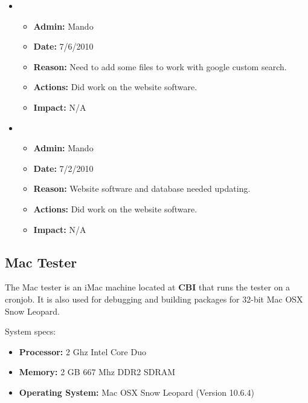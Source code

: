 \documentclass[12pt]{article}
\begin{document}
\begin{itemize}
\item 
\begin{itemize}
\item[] {\bf Admin:} Mando
\item[] {\bf Date:} 7/6/2010
\item[] {\bf Reason:} Need to add some files to work with google custom search.
\item[] {\bf Actions:} Did work on the website software. 
\item[] {\bf Impact:} N/A
\end{itemize}

\item 
\begin{itemize}
\item[] {\bf Admin:} Mando
\item[] {\bf Date:} 7/2/2010
\item[] {\bf Reason:} Website software and database needed updating.
\item[] {\bf Actions:} Did work on the website software. 
\item[] {\bf Impact:} N/A
\end{itemize}
\end{itemize}

\subsection*{Mac Tester}

The Mac tester is an iMac machine located at {\bf CBI} that runs the tester on a cronjob. It is also used for debugging and building packages for 32-bit Mac OSX Snow Leopard.

System specs:
\begin{itemize}
\item[] {\bf Processor:} 2 Ghz Intel Core Duo
\item[] {\bf Memory:} 2 GB 667 Mhz DDR2 SDRAM
\item[] {\bf Operating System:} Mac OSX Snow Leopard (Version 10.6.4) 
\end{itemize}
\end{document}

